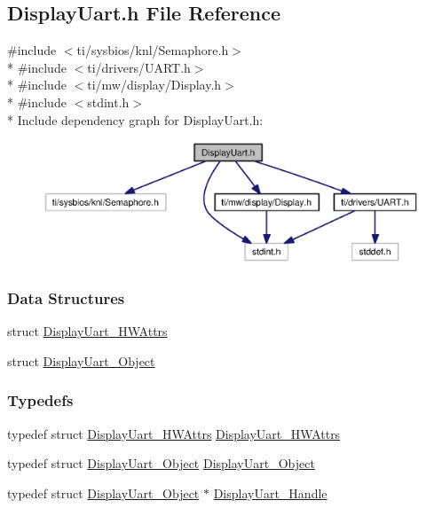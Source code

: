 \subsection{Display\+Uart.\+h File Reference}
\label{_display_uart_8h}
{\ttfamily \#include $<$ti/sysbios/knl/\+Semaphore.\+h$>$}\\*
{\ttfamily \#include $<$ti/drivers/\+U\+A\+R\+T.\+h$>$}\\*
{\ttfamily \#include $<$ti/mw/display/\+Display.\+h$>$}\\*
{\ttfamily \#include $<$stdint.\+h$>$}\\*
Include dependency graph for Display\+Uart.\+h\+:
\nopagebreak
\begin{figure}[H]
\begin{center}
\leavevmode
\includegraphics[width=350pt]{_display_uart_8h__incl}
\end{center}
\end{figure}
\subsubsection*{Data Structures}
\begin{DoxyCompactItemize}
\item 
struct \hyperlink{struct_display_uart___h_w_attrs}{Display\+Uart\+\_\+\+H\+W\+Attrs}
\item 
struct \hyperlink{struct_display_uart___object}{Display\+Uart\+\_\+\+Object}
\end{DoxyCompactItemize}
\subsubsection*{Typedefs}
\begin{DoxyCompactItemize}
\item 
typedef struct \hyperlink{struct_display_uart___h_w_attrs}{Display\+Uart\+\_\+\+H\+W\+Attrs} \hyperlink{_display_uart_8h_a39d1c3ae2b6e69378e721a2730b5b8eb}{Display\+Uart\+\_\+\+H\+W\+Attrs}
\item 
typedef struct \hyperlink{struct_display_uart___object}{Display\+Uart\+\_\+\+Object} \hyperlink{_display_uart_8h_ae0a2eead2881eb2daaeb792fb471c8ef}{Display\+Uart\+\_\+\+Object}
\item 
typedef struct \hyperlink{struct_display_uart___object}{Display\+Uart\+\_\+\+Object} $\ast$ \hyperlink{_display_uart_8h_af5f02e5764d31e98b6c9862c07fa1d0b}{Display\+Uart\+\_\+\+Handle}
\end{DoxyCompactItemize}
